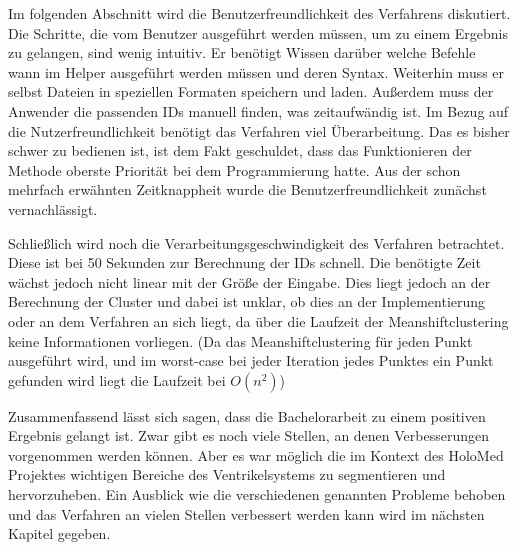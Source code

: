Im folgenden Abschnitt wird die Benutzerfreundlichkeit des Verfahrens diskutiert.
\newline
Die Schritte, die vom Benutzer ausgeführt werden müssen, um zu einem Ergebnis zu gelangen, sind wenig intuitiv. Er benötigt Wissen darüber welche Befehle wann im Helper ausgeführt werden müssen und deren Syntax. Weiterhin muss er selbst Dateien in speziellen Formaten speichern und laden. Außerdem muss der Anwender die passenden IDs manuell finden, was zeitaufwändig ist.
\newline
Im Bezug auf die Nutzerfreundlichkeit benötigt das Verfahren viel Überarbeitung. Das es bisher schwer zu bedienen ist, ist dem Fakt geschuldet, dass das Funktionieren der Methode oberste Priorität bei dem Programmierung hatte. Aus der schon mehrfach erwähnten Zeitknappheit wurde die Benutzerfreundlichkeit zunächst vernachlässigt.


Schließlich wird noch die Verarbeitungsgeschwindigkeit des Verfahren betrachtet.
\newline
Diese ist bei 50 Sekunden zur Berechnung der IDs schnell. Die benötigte Zeit wächst jedoch nicht linear mit der Größe der Eingabe. Dies liegt jedoch an der Berechnung der Cluster und dabei ist unklar, ob dies an der Implementierung oder an dem Verfahren an sich liegt, da über die Laufzeit der Meanshiftclustering keine Informationen vorliegen.
(Da das Meanshiftclustering für jeden Punkt ausgeführt wird, und im worst-case bei jeder Iteration jedes Punktes ein Punkt gefunden wird  liegt die Laufzeit bei $O(n^{2})$)


Zusammenfassend lässt sich sagen, dass die Bachelorarbeit zu einem positiven Ergebnis gelangt ist. Zwar gibt es noch viele Stellen, an denen Verbesserungen vorgenommen werden können. Aber es war möglich die im Kontext des HoloMed Projektes wichtigen Bereiche des Ventrikelsystems zu segmentieren und hervorzuheben.
\newline
Ein Ausblick wie die verschiedenen genannten Probleme behoben und das Verfahren an vielen Stellen verbessert werden kann wird im nächsten Kapitel gegeben.

























